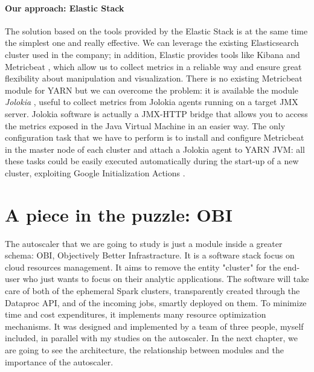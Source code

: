 \documentclass[12pt,twoside,cucitura]{toptesi}
\begin{document}
\subsubsection{Our approach: Elastic Stack}
The solution based on the tools provided by the Elastic Stack is at the same time the simplest one and really effective. We can leverage the existing Elasticsearch cluster used in the company; in addition, Elastic provides tools like Kibana \cite{kibana} and Metricbeat \cite{metricbeat}, which allow us to collect metrics in a reliable way and ensure great flexibility about manipulation and visualization. There is no existing Metricbeat module for YARN but we can overcome the problem: it is available the module \textit{Jolokia} \cite{jolokia_mb}, useful to collect metrics from Jolokia agents \cite{jolokia} running on a target JMX server. Jolokia software is actually a JMX-HTTP bridge that allows you to access the metrics exposed in the Java Virtual Machine in an easier way. The only configuration task that we have to perform is to install and configure Metricbeat in the master node of each cluster and attach a Jolokia agent to YARN JVM: all these tasks could be easily executed automatically during the start-up of a new cluster, exploiting Google Initialization Actions \cite{dataproc_init_actions}.

\chapter{A piece in the puzzle: OBI}
The autoscaler that we are going to study is just a module inside a greater schema: OBI, Objectively Better Infrastracture. It is a software stack focus on cloud resources management. It aims to remove the entity "cluster" for the end-user who just wants to focus on their analytic applications. The software will take care of both of the ephemeral Spark clusters, transparently created through the Dataproc API, and of the incoming jobs, smartly deployed on them. To minimize time and cost expenditures, it implements many resource optimization mechanisms. It was designed and implemented by a team of three people, myself included, in parallel with my studies on the autoscaler. In the next chapter, we are going to see the architecture, the relationship between modules and the importance of the autoscaler.
\end{document}
